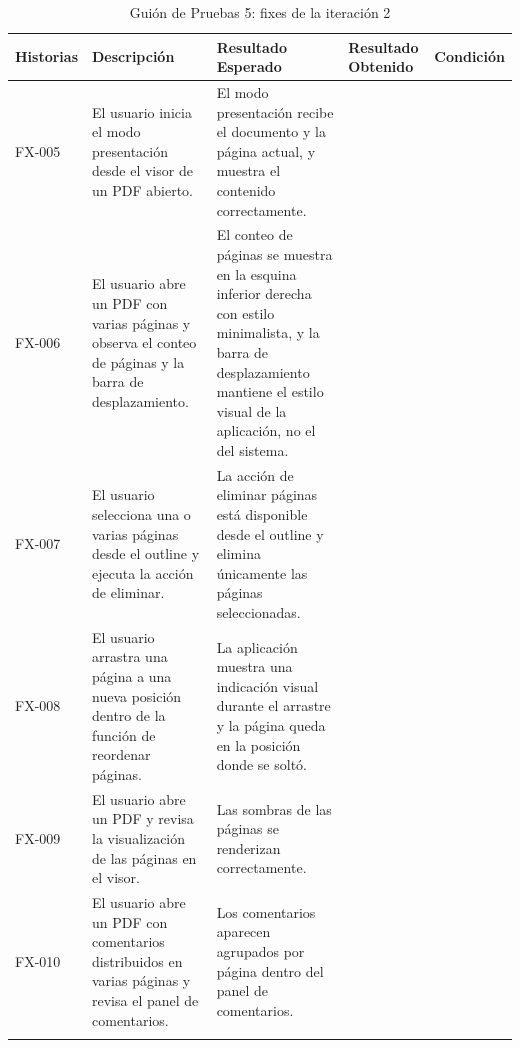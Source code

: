 \begin{longtable}{ | p{2cm} | p{3cm} | p{4cm} | p{4cm} | c |}
      \hline
      \textbf{Historias} & \textbf{Descripción} & \textbf{Resultado Esperado} & \textbf{Resultado Obtenido} & \textbf{Condición}\\
      \hline
      FX-005 &
      El usuario inicia el modo presentación desde el visor de un PDF abierto. &
      El modo presentación recibe el documento y la página actual, y muestra el contenido correctamente. &
       &
      \\
      \hline
      FX-006 &
      El usuario abre un PDF con varias páginas y observa el conteo de páginas y la barra de desplazamiento. &
      El conteo de páginas se muestra en la esquina inferior derecha con estilo minimalista, y la barra de desplazamiento mantiene el estilo visual de la aplicación, no el del sistema. &
       &
      \\
      \hline
      FX-007 &
      El usuario selecciona una o varias páginas desde el outline y ejecuta la acción de eliminar. &
      La acción de eliminar páginas está disponible desde el outline y elimina únicamente las páginas seleccionadas. &
       &
      \\
      \hline
      FX-008 &
      El usuario arrastra una página a una nueva posición dentro de la función de reordenar páginas. &
      La aplicación muestra una indicación visual durante el arrastre y la página queda en la posición donde se soltó. &
       &
      \\
      \hline
      FX-009 &
      El usuario abre un PDF y revisa la visualización de las páginas en el visor. &
      Las sombras de las páginas se renderizan correctamente. &
       &
      \\
      \hline
      FX-010 &
      El usuario abre un PDF con comentarios distribuidos en varias páginas y revisa el panel de comentarios. &
      Los comentarios aparecen agrupados por página dentro del panel de comentarios. &
       &
      \\
      \hline
 
      \caption{Guión de Pruebas 5: fixes de la iteración 2}
      \label{TestScript5}
\end{longtable}
 

